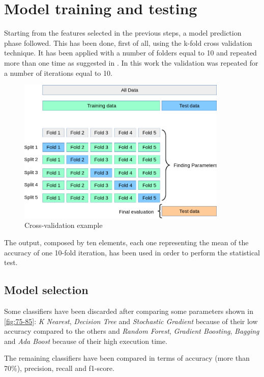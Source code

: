 \section{Model training and testing}

Starting from the features selected in the previous steps, a model prediction phase followed. This has been done, first of all, using the k-fold cross validation technique. It has been applied with a number of folders equal to 10 and repeated more than one time as suggested in \cite{traffic}. In this work the validation was repeated for a number of iterations equal to 10.

\begin{figure}[H]
\centering
\includegraphics[width=10cm]{images/training/cross_validation.png}
\caption{Cross-validation example}
\label{cross-validation}
\end{figure}

\noindent
The output, composed by ten elements, each one representing the mean of the accuracy of one 10-fold iteration, has been used in order to perform the statistical test.

\subsection{Model selection}

Some classifiers have been discarded after comparing some parameters shown in \ref{fig:75-85}: \emph{K Nearest}, \emph{Decision Tree} and \emph{Stochastic Gradient} because of their low accuracy compared to the others and \emph{Random Forest}, \emph{Gradient Boosting}, \emph{Bagging} and \emph{Ada Boost} because of their high execution time.

\noindent
The remaining classifiers have been compared in terms of accuracy (more than 70\%), precision, recall and f1-score.

